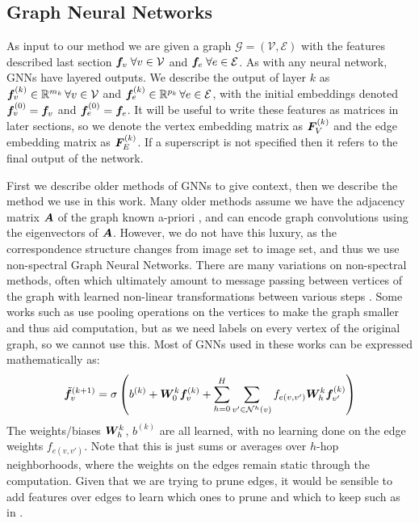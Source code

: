 \documentclass{article} %
\begin{document}
\subsection{Graph Neural Networks}
As input to our method we are given a graph $\mathcal{G} = (\mathcal{V}, \mathcal{E})$ with the features described last section ${\bm{f}}_v \; \forall v \in \mathcal{V}$ and ${\bm{f}}_e \; \forall e \in \mathcal{E}$.
As with any neural network, GNNs have layered outputs.
We describe the output of layer $k$ as ${\bm{f}}_v^{(k)} \in {\mathbb{R}}^{m_k} \, \forall v \in \mathcal{V}$ and ${\bm{f}}_e^{(k)} \in {\mathbb{R}}^{p_k}\, \forall e \in \mathcal{E}$, with the initial embeddings denoted ${\bm{f}}_v^{(0)} = {\bm{f}}_v$ and ${\bm{f}}_e^{(0)} = {\bm{f}}_e$.
It will be useful to write these features as matrices in later sections, so we denote the vertex embedding matrix as ${\bm{F}}_V^{(k)}$ and the edge embedding matrix as ${\bm{F}}_E^{(k)}$.
If a superscript is not specified then it refers to the final output of the network.

First we describe older methods of GNNs to give context, then we describe the method we use in this work.
Many older methods assume we have the adjacency matrix ${\bm{A}}$ of the graph known a-priori \cite{bruna2013spectral}, and can encode graph convolutions using the eigenvectors of ${\bm{A}}$.
However, we do not have this luxury, as the correspondence structure changes from image set to image set, and thus we use non-spectral Graph Neural Networks.
There are many variations on non-spectral methods, often which ultimately amount to message passing between vertices of the graph with learned non-linear transformations between various steps \cite{kipf2017semi, defferrard2016convolutional, gama2018mimo, gama2018convolutional}.
Some works such as \cite{gama2019convolutional} use pooling operations on the vertices to make the graph smaller and thus aid computation, but as we need labels on every vertex of the original graph, so we cannot use this.
Most of GNNs used in these works can be expressed mathematically as:
\begin{align*}
\tilde{{\bm{f}}}_v^{(k+1)} =&\; \sigma\left( b^{(k)} + {\bm{W}}_0^{k} {\bm{f}}_{v}^{(k)} + \sum_{h=0}^H \sum_{v' \in \mathcal{N}^{h}(v)} f_{e(v,v')} {\bm{W}}_{h}^{k} {\bm{f}}_{v'}^{(k)} \right) \\
\end{align*}
The weights/biases ${\bm{W}}_{h}^{k}$, $b^{(k)}$ are all learned, with no learning done on the edge weights $f_{e(v,v')}$. 
Note that this is just sums or averages over $h$-hop neighborhoods, where the weights on the edges remain static through the computation.
Given that we are trying to prune edges, it would be sensible to add features over edges to learn which ones to prune and which to keep such as in \cite{scarselli2009graph}.
\end{document}
